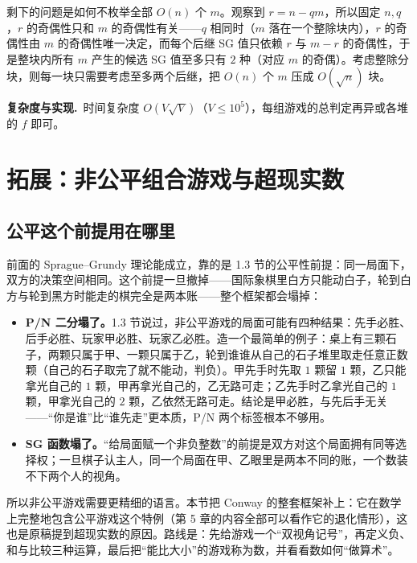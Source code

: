 \documentclass[UTF8,a4paper,11pt,oneside,openany,fontset=fandol]{ctexbook}
\theoremstyle{definition}
\newcommand{\cost}{\par\noindent\textbf{复杂度与实现.}\ }
\begin{document}
剩下的问题是如何不枚举全部 $O(n)$ 个 $m$。观察到 $r=n-qm$，所以固定 $n,q$，$r$ 的奇偶性只和 $m$ 的奇偶性有关——$q$ 相同时（$m$ 落在一个整除块内），$r$ 的奇偶性由 $m$ 的奇偶性唯一决定，而每个后继 SG 值只依赖 $r$ 与 $m-r$ 的奇偶性，于是整块内所有 $m$ 产生的候选 SG 值至多只有 $2$ 种（对应 $m$ 的奇偶）。考虑整除分块，则每一块只需要考虑至多两个后继，把 $O(n)$ 个 $m$ 压成 $O(\sqrt n)$ 块。

\cost 时间复杂度 $O(V\sqrt V)$（$V\le10^{5}$），每组游戏的总判定再异或各堆的 $f$ 即可。

\chapter{拓展：非公平组合游戏与超现实数}
\section{公平这个前提用在哪里}
前面的 Sprague--Grundy 理论能成立，靠的是 1.3 节的公平性前提：同一局面下，双方的决策空间相同。这个前提一旦撤掉——国际象棋里白方只能动白子，轮到白方与轮到黑方时能走的棋完全是两本账——整个框架都会塌掉：
\begin{itemize}
\item \textbf{P/N 二分塌了。}1.3 节说过，非公平游戏的局面可能有四种结果：先手必胜、后手必胜、玩家甲必胜、玩家乙必胜。造一个最简单的例子：桌上有三颗石子，两颗只属于甲、一颗只属于乙，轮到谁谁从自己的石子堆里取走任意正数颗（自己的石子取完了就不能动，判负）。甲先手时先取 $1$ 颗留 $1$ 颗，乙只能拿光自己的 $1$ 颗，甲再拿光自己的，乙无路可走；乙先手时乙拿光自己的 $1$ 颗，甲拿光自己的 $2$ 颗，乙依然无路可走。结论是甲必胜，与先后手无关——“你是谁”比“谁先走”更本质，P/N 两个标签根本不够用。
\item \textbf{SG 函数塌了。}“给局面赋一个非负整数”的前提是双方对这个局面拥有同等选择权；一旦棋子认主人，同一个局面在甲、乙眼里是两本不同的账，一个数装不下两个人的视角。
\end{itemize}
所以非公平游戏需要更精细的语言。本节把 Conway 的整套框架补上：它在数学上完整地包含公平游戏这个特例（第 5 章的内容全部可以看作它的退化情形），这也是原稿提到超现实数的原因。路线是：先给游戏一个“双视角记号”，再定义负、和与比较三种运算，最后把“能比大小”的游戏称为数，并看看数如何“做算术”。
\end{document}
